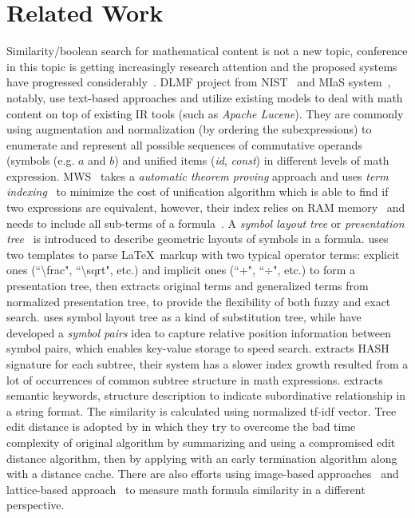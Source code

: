\documentclass{acm_proc_article-sp}
\begin{document}
\section{Related Work}
Similarity/boolean search for mathematical content is not a new topic,
conference in this topic is getting increasingly research attention and the proposed systems have progressed considerably~\cite{ov}.
DLMF project from NIST~\cite{Youssef03,Youssef05} and MIaS system~\cite{mias11a,mias11,mias:thesis}, notably, use text-based approaches and utilize existing models to deal with math content on top of existing IR tools (such as \textit{Apache Lucene}). 
They are commonly using augmentation and normalization (by ordering the subexpressions) to enumerate and represent all possible sequences of commutative operands (symbols (e.g. $a$ and $b$) and unified items (\textit{id}, \textit{const}) in different levels of math expression.
MWS~\cite{Kohlhase06,Kohlhase0p4,Kohlhase0p5} takes a \textit{automatic theorem proving} approach and uses \textit{term indexing}~\cite{graf96} to minimize the cost of unification algorithm which is able to find if two expressions are equivalent, 
however, their index relies on RAM memory~\cite{Kohlhase0p5} and needs to include all sub-terms of a formula~\cite{Kohlhase06}.
A \textit{symbol layout tree} or \textit{presentation tree}~\cite{symbollayout12,WikiMirs13} is introduced to describe geometric layouts of symbols in a formula. 
\cite{WikiMirs13} uses two templates to parse \LaTeX\ markup with two typical operator terms: explicit ones (``\textbackslash frac", ``\textbackslash sqrt", etc.) and implicit ones (``$+$", ``$\div$", etc.) to form a presentation tree,
then extracts original terms and generalized terms from normalized presentation tree, to provide the flexibility of both fuzzy and exact search.
\cite{symbollayout12} uses symbol layout tree as a kind of substitution tree, while \cite{symbolpairs15,symbolpair15:2} have developed a \textit{symbol pairs} idea to capture relative position information between symbol pairs,
which enables key-value storage to speed search.
\cite{newretrievalsystem} extracts HASH signature for each subtree, their system has a slower index growth resulted from a lot of occurrences of common subtree structure in math expressions.
\cite{DOMextraction} extracts semantic keywords, structure description to indicate subordinative relationship in a string format. The similarity is calculated using normalized tf-idf vector.
Tree edit distance is adopted by \cite{editdisXML11,editdisXML13} in which they try to overcome the bad time complexity of original algorithm by summarizing and using a compromised edit distance algorithm, then by applying with an early termination algorithm along with a distance cache.
There are also efforts using image-based approaches~\cite{imageb11,handwrite} and lattice-based approach~\cite{lattice} to measure math formula similarity in a different perspective.
\end{document}
